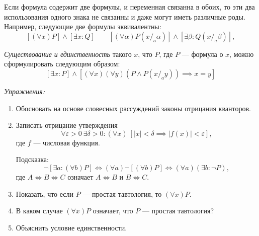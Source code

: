 Если формула содержит две формулы, и переменная
связанна в обоих, то эти два использования
одного знака не связанны и даже могут иметь различные роды.
Например, следующие две формулы эквивалентны:
\[
	[(\forall x)P]\land[\exists x:Q]\qquad
	[(\forall \alpha)P(x/_{a}\alpha)]\land[\exists \beta:Q(x/_{a}\beta)],
\]

\label{page:exists_only}
{\it Существование и единственность} такого $x$, что $P$,
где $P$ --- формула о $x$, можно сформулировать следующим образом:
\[
	[\exists x:P]\land [(\forall x)(\forall y)(P\land P(x/_{a}y))\implies x=y]
\]

\vspace{1em}
{\it Упражнения:}
\begin{enumerate}
	\item{}Обосновать на основе словесных рассуждений законы отрицания
	кванторов\label{ex:quantor_neg_def}.
	\item{}Записать отрицание утверждения
	\[
		\forall \varepsilon>0~\exists \delta>0:
		(\forall x)~[|x|<\delta\implies |f(x)|<\varepsilon],
	\]
	где $f$ --- числовая функция.

	Подсказка:
	\[
		\lnot[\exists a:(\forall b)P]\iff(\forall a)\lnot[(\forall b)P]\iff
		(\forall a)(\exists b:\lnot P),
	\]
	где $A\iff B\iff C$ означает $A\iff B$ и $B\iff C$.

	\item{}Показать, что если $P$ --- простая тавтология, то $(\forall x)P$.

	\item{}В каком случае $(\forall x)P$ означает, что $P$ --- простая тавтология?

	\item{}Объяснить условие единственности.
\end{enumerate}
